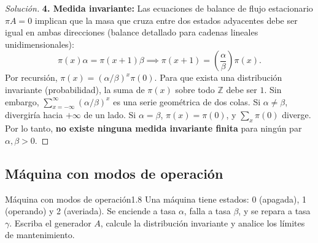 \documentclass[10pt,a4paper]{article}
\begin{document}
\begin{proof}[Solución]
    \textbf{4. Medida invariante:}
    Las ecuaciones de balance de flujo estacionario $\pi A = 0$ implican que la masa que cruza entre dos estados adyacentes debe ser igual en ambas direcciones (balance detallado para cadenas lineales unidimensionales):
    \[ \pi(x)\alpha = \pi(x+1)\beta \implies \pi(x+1) = \left(\frac{\alpha}{\beta}\right) \pi(x). \]
    Por recursión, $\pi(x) = (\alpha/\beta)^x \pi(0)$.
    Para que exista una distribución invariante (probabilidad), la suma de $\pi(x)$ sobre todo $\mathbb{Z}$ debe ser $1$.
    Sin embargo, $\sum_{x=-\infty}^{\infty} (\alpha/\beta)^x$ es una serie geométrica de dos colas. Si $\alpha \neq \beta$, divergiría hacia $+\infty$ de un lado. Si $\alpha = \beta$, $\pi(x) = \pi(0)$, y $\sum_x \pi(0)$ diverge.
    Por lo tanto, \textbf{no existe ninguna medida invariante finita} para ningún par $\alpha, \beta > 0$.
\end{proof}

\newpage
\subsection{Máquina con modos de operación}

\begin{ejercicio}{Máquina con modos de operación}{1.8}
    Una máquina tiene estados: 0 (apagada), 1 (operando) y 2 (averiada). 
    Se enciende a tasa $\alpha$, falla a tasa $\beta$, y se repara a tasa $\gamma$.
    Escriba el generador $A$, calcule la distribución invariante y analice los límites de mantenimiento.
\end{ejercicio}
\end{document}
